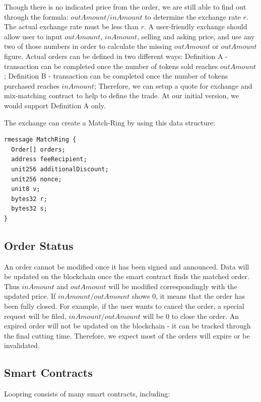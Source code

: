 \documentclass[UTF8,nofonts]{article}
\begin{document}
Though there is no indicated price from the order, we are still able to find out through the formula: $outAmount / inAmount$ to determine the exchange rate $r$. The actual exchange rate must be less than $r$. A user-friendly exchange should allow user to input $outAmount$, $inAmount$, selling and asking price, and use any two of those numbers in order to calculate the missing $outAmount$ or $outAmount$ figure.
Actual orders can be defined in two different ways: Definition A - transaction can be completed once the number of tokens sold reaches $outAmount$ ; Definition B - transaction can be completed once the number of tokens purchased reaches $inAmount$; Therefore, we can setup a quote for exchange and mix-matching contract to help to define the trade. At our initial version, we would support Definition A only.

The exchange can create a Match-Ring by using this data structure:
\begin{verbatim}
rmessage MatchRing {
  Order[] orders;
  address feeRecipient;
  unit256 additionalDiscount;
  unit256 nonce;
  unit8 v;
  bytes32 r;
  bytes32 s;
}
\end{verbatim}


\subsection{Order Status\label{sec: orderstate}}


An order cannot be modified once it has been signed and announced. Data will be updated on the blockchain once the smart contract finds the matched order. Thus $inAmount$ and $outAmount$ will be modified correspondingly with the updated price. If $inAmount / outAmount$ shows 0,  it means that the order has been fully closed. For example, if the user wants to cancel the order, a special request will be filed,  $inAmount / outAmount$ will be 0 to close the order. An expired order will not be updated on the blockchain - it can be tracked through the final cutting time. Therefore, we expect most of the orders will expire or be invalidated.

\subsection{Smart Contracts\label{sec: contracts}}

Loopring consists of many smart contracts, including:
\end{document}
